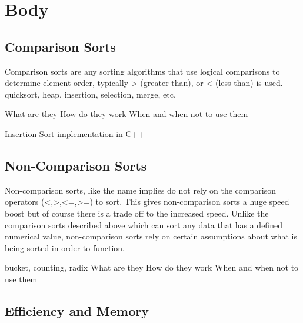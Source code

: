 \documentclass[12pt]{article}
\begin{document}
	
	
	
	\section{Body}
	
	\subsection{Comparison Sorts}
	Comparison sorts are any sorting algorithms that use logical comparisons to determine element order, typically > (greater than), or < (less than)  is used.
	quicksort, heap, insertion, selection, merge, etc.
	

	
	What are they
	How do they work
	When and when not to use them
	
	
	
	
	
	
	\begin{Snippet}[h]
		
		\caption[Insertion Sort]{Insertion Sort implementation in C++}	
	\end{Snippet}
	
	
	
	\subsection{Non-Comparison Sorts}
	
	Non-comparison sorts, like the name implies do not rely on the comparison operators (<,>,<=,>=) to sort.
	This gives non-comparison sorts a huge speed boost but of course there is a trade off to the increased speed. 
	Unlike the comparison sorts described above which can sort any data that has a defined numerical value, non-comparison sorts rely on certain assumptions about what is being sorted in order to function.
	
	bucket, counting, radix
	What are they
	How do they work
	When and when not to use them
	
	
	\subsection{Efficiency and Memory}
	


	

	
	
\end{document}

